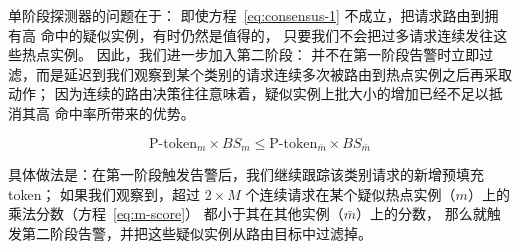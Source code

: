 单阶段探测器的问题在于：
即使方程~\ref{eq:consensus-1} 不成立，把请求路由到拥有高 {\kvcache} 命中的疑似实例，有时仍然是值得的，
只要我们不会把过多请求连续发往这些热点实例。
因此，我们进一步加入第二阶段：
并不在第一阶段告警时立即过滤，而是延迟到我们观察到某个类别的请求连续多次被路由到热点实例之后再采取动作；
因为连续的路由决策往往意味着，疑似实例上批大小的增加已经不足以抵消其高 {\kvcache} 命中率所带来的优势。

\begin{equation}
  \text{P-token}_m \times BS_m \leq \text{P-token}_{\bar{m}} \times BS_{\bar{m}}
  \label{eq:m-score}
\end{equation}

具体做法是：在第一阶段触发告警后，我们继续跟踪该类别请求的新增预填充 token；
如果我们观察到，超过 \(2 \times M\) 个连续请求在某个疑似热点实例（$m$）上的乘法分数（方程~\ref{eq:m-score}）
都小于其在其他实例（$\bar{m}$）上的分数，
那么就触发第二阶段告警，并把这些疑似实例从路由目标中过滤掉。
